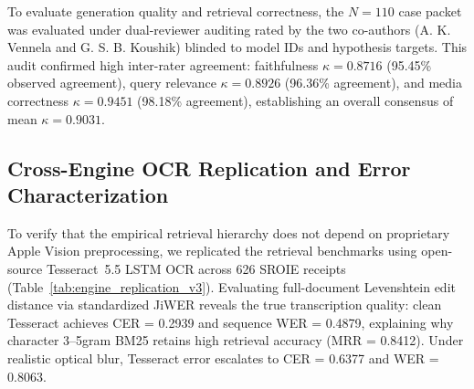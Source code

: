 \documentclass[conference]{IEEEtran}
\begin{document}
To evaluate generation quality and retrieval correctness, the $N=110$ case packet was evaluated under dual-reviewer auditing rated by the two co-authors (A. K. Vennela and G. S. B. Koushik) blinded to model IDs and hypothesis targets. This audit confirmed high inter-rater agreement: faithfulness $\kappa = 0.8716$ (95.45\% observed agreement), query relevance $\kappa = 0.8926$ (96.36\% agreement), and media correctness $\kappa = 0.9451$ (98.18\% agreement), establishing an overall consensus of mean $\kappa = 0.9031$.

\begin{table}[t]
\centering\small
\caption{Extractive PRF vs.\ Generative LLM Multi-Hop Bridging across Diagnostic Multi-Hop ($N=50$) and Expanded ($N=100$) Suites.}\label{tab:multihop_v6}
\end{table}

\subsection{Cross-Engine OCR Replication and Error Characterization}
\label{sec:cross_engine_replication}

To verify that the empirical retrieval hierarchy does not depend on proprietary Apple Vision preprocessing, we replicated the retrieval benchmarks using open-source Tesseract~5.5 LSTM OCR across 626 SROIE receipts (Table~\ref{tab:engine_replication_v3}). Evaluating full-document Levenshtein edit distance via standardized JiWER \cite{schneider2024jiwer} reveals the true transcription quality: clean Tesseract achieves CER = 0.2939 and sequence WER = 0.4879, explaining why character 3--5gram BM25 retains high retrieval accuracy (MRR = 0.8412). Under realistic optical blur, Tesseract error escalates to CER = 0.6377 and WER = 0.8063.
\end{document}
